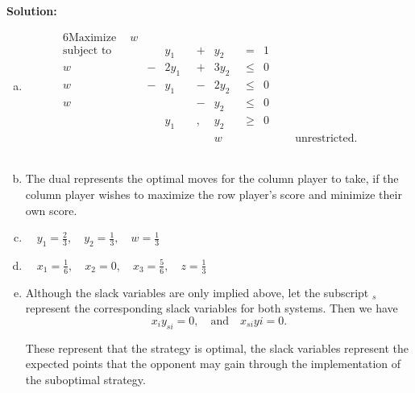 \documentclass[12pt]{amsart}
\begin{document}
\clearpage
\textbf{Solution:}
\begin{enumerate}[a.]
	\item
		\begin{alignat*}{6}
			\text{Maximize}\quad\ w & {} {} &\qquad& {} {} &\qquad& {} {} &\qquad&{}\qquad    {}  &   & \\
			\text{subject to}\qquad\,
		 	  & {} {} &  y_1& {}+{} &  y_2 &{} =  {}  & 1 & \\
			w & {}-{} & 2y_1& {}+{} & 3y_2 &{}\leq{}  & 0 & \\
			w & {}-{} &  y_1& {}-{} & 2y_2 &{}\leq{}  & 0 & \\
			w & {} {} &     & {}-{} & y_2  &{}\leq{}  & 0 & \\
			  & {} {} &  y_1&,{} {} & y_2  &{}\geq{}  & 0 & \\
			  & {} {} &     & {} {} &   w  &{}    {}  &   & \text{unrestricted}. 
		\end{alignat*} \\
	
	\item 
		The dual represents the optimal moves for the column player to take,
		if the column player wishes to maximize the row player's score
		and minimize their own score. \\
		
	\item
		\(\quad y_1 = \frac{2}{3},\quad y_2 = \frac{1}{3},\quad w = \frac{1}{3}\) \\
		
	\item 
		\(\quad x_1 = \frac{1}{6},\quad x_2 = 0,\quad x_3 = \frac{5}{6},\quad z = \frac{1}{3}\) \\
	
	\item
		Although the slack variables are only implied above, let the subscript \(_s\) 
		represent the corresponding slack variables for both systems.
		Then we have
		\[x_iy_{si}=0, \quad\text{and}\quad x_{si}yi = 0.\]		
		
		These represent that the strategy is optimal,
		the slack variables represent the expected points that the opponent may gain 
		through the implementation of the suboptimal strategy.
		
\end{enumerate}
\end{document}
